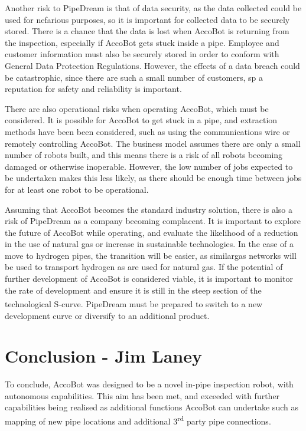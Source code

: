 \documentclass[11pt]{article}		%
\newcommand{\supercite}[1]{\textsuperscript{\cite{#1}}}		%
\begin{document}
		     	Another risk to PipeDream is that of data security, as the data collected could be used for nefarious purposes, so it is important for collected data to be securely stored.
		     	There is a chance that the data is lost when AccoBot is returning from the inspection, especially if AccoBot gets stuck inside a pipe.
		     	Employee and customer information must also be securely stored in order to conform with General Data Protection Regulations.
		     	However, the effects of a data breach could be catastrophic, since there are such a small number of customers, sp a reputation for safety and reliability is important.
		     	
		     	There are also operational risks when operating AccoBot, which must be considered.
		     	It is possible for AccoBot to get stuck in a pipe, and extraction methods have been been considered, such as using the communications wire or remotely controlling AccoBot.
		     	The business model assumes there are only a small number of robots built, and this means there is a risk of all robots becoming damaged or otherwise inoperable.
		     	However, the low number of jobs expected to be undertaken makes this less likely, as there should be enough time between jobs for at least one robot to be operational.
		     	
		     	Assuming that AccoBot becomes the standard industry solution, there is also a risk of PipeDream as a company becoming complacent.
		     	It is important to explore the future of AccoBot while operating, and evaluate the likelihood of a reduction in the use of natural gas or increase in sustainable technologies.
		     	In the case of a move to hydrogen pipes, the transition will be easier, as similargas networks will be used to transport hydrogen as are used for natural gas.
		     	If the potential of further development of AccoBot is considered viable, it is important to monitor the rate of development and ensure it is still in the steep section of the technological S-curve\supercite{christensen1998innovation}.
		     	PipeDream must be prepared to switch to a new development curve or diversify to an additional product.
			    
    \section[Conclusion]{Conclusion - Jim Laney}
        
        To conclude, AccoBot was designed to be a novel in-pipe inspection robot, with autonomous capabilities.
        This aim has been met, and exceeded with further capabilities being realised as additional functions AccoBot can undertake such as mapping of new pipe locations and additional 3\textsuperscript{rd} party pipe connections.
        
\end{document}
